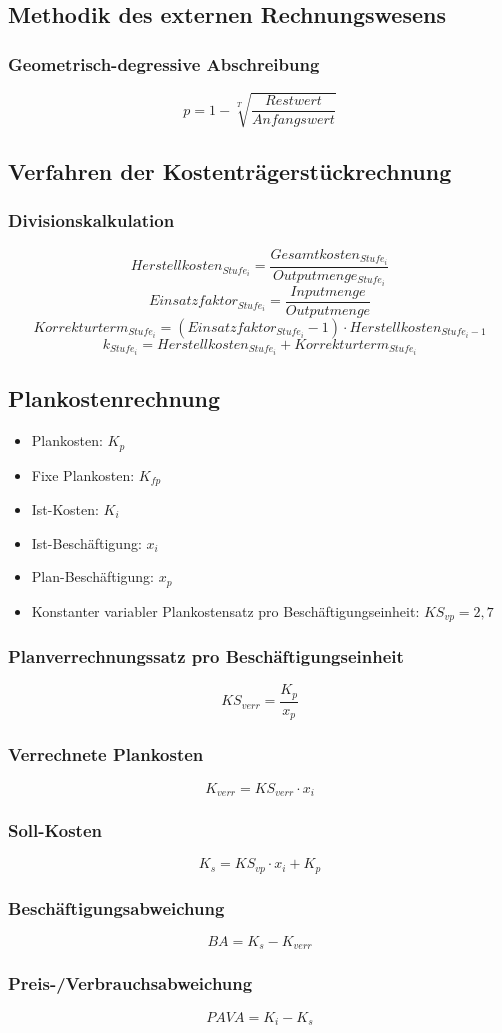 \subsection{Methodik des externen Rechnungswesens}

\subsubsection{Geometrisch-degressive Abschreibung}
\[p = 1 - \sqrt[T]{\frac{Restwert}{Anfangswert}}\]


\subsection{Verfahren der Kostenträgerstückrechnung}

\subsubsection{Divisionskalkulation}
\[Herstellkosten_{Stufe_i} = \frac{Gesamtkosten_{Stufe_i}}{Outputmenge_{Stufe_i}}\]
\[Einsatzfaktor_{Stufe_i}=\frac{Inputmenge}{Outputmenge}\]
\[Korrekturterm_{Stufe_i} = (Einsatzfaktor_{Stufe_i}-1)\cdot Herstellkosten_{Stufe_i-1}\]
\[k_{Stufe_i} = Herstellkosten_{Stufe_i}+Korrekturterm_{Stufe_i}\]


\subsection{Plankostenrechnung}
\begin{itemize}
	\item Plankosten: \(K_p\)
	\item Fixe Plankosten: \(K_{fp}\)
	\item Ist-Kosten: \(K_i\)
	\item Ist-Beschäftigung: \(x_i\)
	\item Plan-Beschäftigung: \(x_p\)
	\item Konstanter variabler Plankostensatz pro Beschäftigungseinheit: \(KS_{vp}=2,7\)
\end{itemize}

\subsubsection{Planverrechnungssatz pro Beschäftigungseinheit}
\[KS_{verr} = \frac{K_p}{x_p}\]

\subsubsection{Verrechnete Plankosten}
\[K_{verr} = KS_{verr} \cdot x_i\]

\subsubsection{Soll-Kosten}
\[K_s = KS_{vp} \cdot x_i + K_p\]

\subsubsection{Beschäftigungsabweichung}
\[BA = K_s - K_{verr}\]

\subsubsection{Preis-/Verbrauchsabweichung}
\[PAVA = K_i - K_s\]

